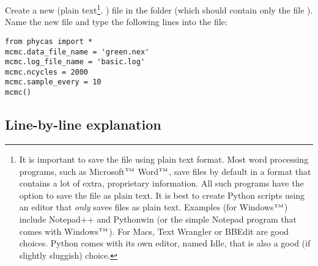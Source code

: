 \documentclass[10pt]{article}
\newcommand{\trademark}[1]{#1${}^{\mbox{\tiny TM}}$}
\begin{document}
Create a new (plain text\footnote{
%
It is important to save the file using plain text format. Most word processing programs, such as \trademark{Microsoft} \trademark{Word}, save files by default in a format that contains a lot of extra, proprietary information. All such programs have the option to save the file as plain text. It is best to create Python scripts using an editor that {\em only} saves files as plain text. Examples (for \trademark{Windows}) include Notepad++ and Pythonwin (or the simple Notepad program that comes with \trademark{Windows}). For Macs, Text Wrangler or BBEdit are good choices. Python comes with its own editor, named Idle, that is also a good (if slightly sluggish) choice.}.
%
) file in the folder (which should contain only the file ). Name the new file  and type the following lines into the file:
\begin{verbatim}
from phycas import *
mcmc.data_file_name = 'green.nex'
mcmc.log_file_name = 'basic.log'
mcmc.ncycles = 2000
mcmc.sample_every = 10
mcmc()
\end{verbatim}

\subsection{Line-by-line explanation} \label{subsec:basicpyexplanation}
\end{document}
